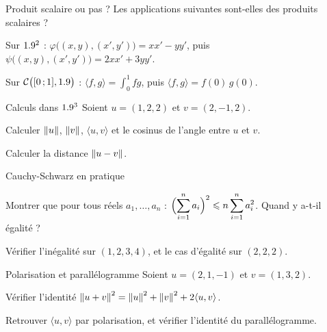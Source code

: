 \exercices
{}

\begin{exercice}[1]{Produit scalaire ou pas ?}
Les applications suivantes sont-elles des produits scalaires ?
\begin{questions}
  \item Sur $1.9^{2}$ :
    $\varphi\bigl((x,y),(x',y')\bigr)=xx'-yy'$, puis
    $\psi\bigl((x,y),(x',y')\bigr)=2xx'+3yy'$.
  \item Sur $\mathcal{C}\bigl(\mathopen{[}0\,{;}\,1\mathclose{]},1.9\bigr)$ :
    $\langle f,g\rangle=\displaystyle\int_{0}^{1}fg$, puis
    $\langle f,g\rangle=f(0)\,g(0)$.
\end{questions}
\end{exercice}

\begin{exercice}[1]{Calculs dans $1.9^{3}$}
Soient $u=(1,2,2)$ et $v=(2,-1,2)$.
\begin{questions}
  \item Calculer $\left\lVert u\right\rVert$, $\left\lVert v\right\rVert$, $\langle u,v\rangle$ et le
    cosinus de l'angle entre $u$ et $v$.
  \item Calculer la distance $\left\lVert u-v\right\rVert$.
\end{questions}
\end{exercice}

\begin{exercice}[1]{Cauchy-Schwarz en pratique}
\begin{questions}
  \item Montrer que pour tous réels $a_1,\dots,a_n$ :
    $\Bigl(\displaystyle\sum_{i=1}^{n}a_i\Bigr)^{2}
    \leqslant n\displaystyle\sum_{i=1}^{n}a_i^{2}$.
    Quand y a-t-il égalité ?
  \item Vérifier l'inégalité sur $(1,2,3,4)$, et le cas d'égalité sur
    $(2,2,2)$.
\end{questions}
\end{exercice}

\begin{exercice}[1]{Polarisation et parallélogramme}
Soient $u=(2,1,-1)$ et $v=(1,3,2)$.
\begin{questions}
  \item Vérifier l'identité
    $\left\lVert u+v\right\rVert^{2}=\left\lVert u\right\rVert^{2}+\left\lVert v\right\rVert^{2}+2\langle u,v\rangle$.
  \item Retrouver $\langle u,v\rangle$ par polarisation, et vérifier
    l'identité du parallélogramme.
\end{questions}
\end{exercice}

